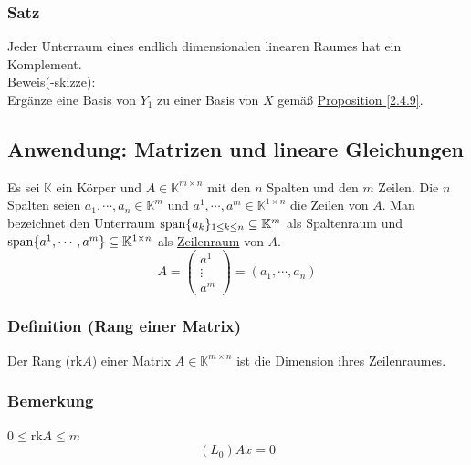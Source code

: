 \subsubsection{Satz}
Jeder Unterraum eines endlich dimensionalen linearen Raumes hat ein Komplement.\\
\underline{Beweis}(-skizze):\\
Ergänze eine Basis von $Y_1$ zu einer Basis von $X$ gemäß \hyperref[2.4.9]{Proposition \ref*{2.4.9}}.
\subsection{Anwendung: Matrizen und lineare Gleichungen}
Es sei $\mathbb{K}$ ein Körper und $A\in\mathbb{K}^{m\times n}$ mit den $n$ Spalten und den $m$ Zeilen.  Die $n$ Spalten seien $a_1,\cdots ,a_n\in \mathbb{K}^m$ und $a^1,\cdots ,a^m\in \mathbb{K}^{1\times n}$ die Zeilen von $A$.  Man bezeichnet den Unterraum $\operatorname{span}\{a_k\}_{1\leq k\leq n}\subseteq \mathbb{K}^m$ als Spaltenraum und $\operatorname{span}\{a^1,\cdots ,a^m\}\subseteq \mathbb{K}^{1\times n}$ als \underline{Zeilenraum} von $A$.
\[A=\begin{pmatrix}a^1\\ \vdots \\ a^m\end{pmatrix} = (a_1,\cdots ,a_n)\]
\subsubsection{Definition (Rang einer Matrix)}
\label{Mrang}
Der \underline{Rang} (rk$A$) einer Matrix $A\in\mathbb{K}^{m\times n}$ ist die Dimension ihres Zeilenraumes.
\subsubsection{Bemerkung}
$0\leq$rk$A\leq m$
\[(L_0) Ax=0\]
